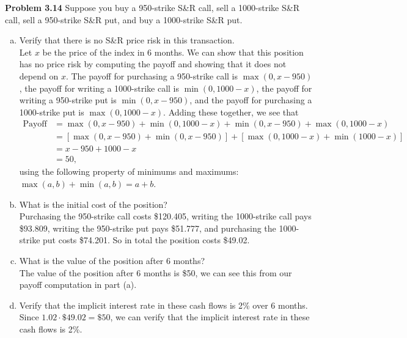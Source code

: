 \documentclass[12pt]{article}
\newcommand{\problem}[1]{\bigskip \noindent \textbf{Problem #1}}
\theoremstyle{plain}
\begin{document}
\problem{3.14} Suppose you buy a 950-strike S\&R call, sell a 1000-strike S\&R call, sell a 950-strike S\&R put, and buy a 1000-strike S\&R put.
\begin{enumerate}[(a)]
\item Verify that there is no S\&R price risk in this transaction.\\

Let $x$ be the price of the index in 6 months. We can show that this position has no price risk by computing the payoff and showing that it does not depend on $x$. The payoff for purchasing a 950-strike call is $\max(0,x-950)$, the payoff for writing a 1000-strike call is $\min(0,1000-x)$, the payoff for writing a 950-strike put is $\min(0,x-950)$, and the payoff for purchasing a 1000-strike put is $\max(0,1000-x)$. Adding these together, we see that
\begin{align*}
\text{Payoff} &= \max(0,x-950) + \min(0,1000-x) + \min(0,x-950) + \max(0,1000-x)\\
&= \left[\max(0,x-950) + \min(0,x-950)\right] + \left[\max(0,1000-x) + \min(1000-x)\right]\\
&= x-950 + 1000-x\\
&= 50,
\end{align*}
using the following property of minimums and maximums: $\max(a,b) + \min(a,b) = a + b$.

\item What is the initial cost of the position?\\

Purchasing the 950-strike call costs \$120.405, writing the 1000-strike call pays \$93.809, writing the 950-strike put pays \$51.777, and purchasing the 1000-strike put costs \$74.201. So in total the position costs \$49.02.

\item What is the value of the position after 6 months?\\

The value of the position after 6 months is \$50, we can see this from our payoff computation in part (a).

\item Verify that the implicit interest rate in these cash flows is 2\% over 6 months.\\

Since $1.02 \cdot \$49.02 = \$50$, we can verify that the implicit interest rate in these cash flows is 2\%.
\end{enumerate}
\end{document}
